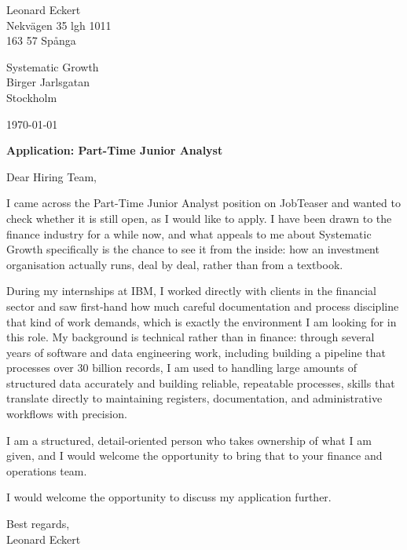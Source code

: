 \documentclass[letterpaper,11pt]{article}
\begin{document}
\small

{\raggedright
Leonard Eckert \\
Nekv\"agen 35 lgh 1011 \\
163 57 Sp\r{a}nga
\par}

\vspace{18pt}

{\raggedright
Systematic Growth \\
Birger Jarlsgatan \\
Stockholm
\par}

\vspace{18pt}

\hfill\today

\vspace{18pt}

\textbf{Application: Part-Time Junior Analyst}

\vspace{6pt}

Dear Hiring Team,

I came across the Part-Time Junior Analyst position on JobTeaser and wanted to check whether it is still open, as I would like to apply. I have been drawn to the finance industry for a while now, and what appeals to me about Systematic Growth specifically is the chance to see it from the inside: how an investment organisation actually runs, deal by deal, rather than from a textbook.

During my internships at IBM, I worked directly with clients in the financial sector and saw first-hand how much careful documentation and process discipline that kind of work demands, which is exactly the environment I am looking for in this role. My background is technical rather than in finance: through several years of software and data engineering work, including building a pipeline that processes over 30 billion records, I am used to handling large amounts of structured data accurately and building reliable, repeatable processes, skills that translate directly to maintaining registers, documentation, and administrative workflows with precision.

I am a structured, detail-oriented person who takes ownership of what I am given, and I would welcome the opportunity to bring that to your finance and operations team.

I would welcome the opportunity to discuss my application further.

\vspace{18pt}

{\raggedright
Best regards, \\
Leonard Eckert
\par}
\end{document}
